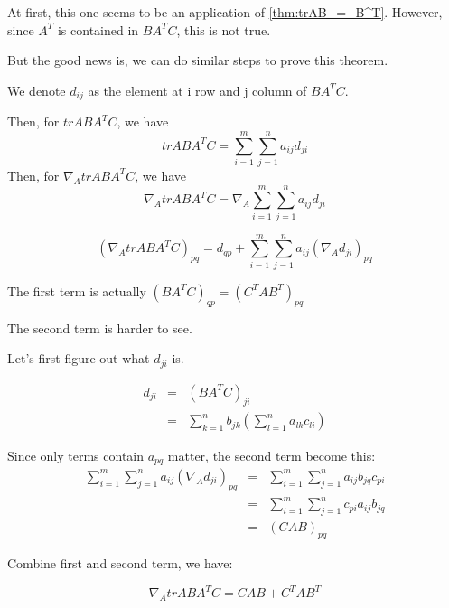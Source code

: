 \documentclass[a4paper]{article}
\newenvironment{proof}[1][Proof]{\begin{trivlist}
\item[\hskip \labelsep {\bfseries #1}]}{\end{trivlist}}
\newcommand{\qed}{\nobreak \ifvmode \relax \else
      \ifdim\lastskip<1.5em \hskip-\lastskip
      \hskip1.5em plus0em minus0.5em \fi \nobreak
      \vrule height0.75em width0.5em depth0.25em\fi}
\begin{document}
\begin{proof}
	At first, this one seems to be an application of
	\cref{thm:trAB_=_B^T}. However, since $A^T$ is contained in $BA^TC$,
	this is not true.

	But the good news is, we can do similar steps to prove this theorem.

	We denote $d_{ij}$ as the element at i row and j column of $BA^TC$.

	Then, for $trABA^TC$, we have
	\begin{displaymath}
		trABA^TC = \sum\limits^{m}_{i=1}\sum\limits^{n}_{j=1}a_{ij}d_{ji}
	\end{displaymath}
	Then, for $\nabla_A trABA^TC$, we have
	\begin{displaymath}
		\nabla_A trABA^TC = \nabla_A \sum\limits^{m}_{i=1}\sum\limits^{n}_{j=1}a_{ij}d_{ji}
	\end{displaymath}

	\begin{displaymath}
		(\nabla_A trABA^TC)_{pq} = d_{qp} +
		\sum\limits^{m}_{i=1}\sum\limits^{n}_{j=1}a_{ij}(\nabla_A
		d_{ji})_{pq}
	\end{displaymath}

	The first term is actually $(BA^TC)_{qp} = (C^TAB^T)_{pq}$

	The second term is harder to see.

	Let's first figure out what $d_{ji}$ is.

	\begin{eqnarray}
		d_{ji}	& = & (BA^TC)_{ji} \nonumber\\
		& = &
		\sum\limits^{n}_{k=1}b_{jk}(\sum\limits^{n}_{l=1}a_{lk}c_{li})
		\nonumber
	\end{eqnarray}

	Since only terms contain $a_{pq}$ matter, the second term become
	this:
	\begin{eqnarray}
		\sum\limits^{m}_{i=1}\sum\limits^{n}_{j=1}a_{ij}(\nabla_A
		d_{ji})_{pq} & = &
				\sum\limits^{m}_{i=1}\sum\limits^{n}_{j=1}a_{ij}b_{jq}c_{pi}
				\nonumber\\
				& = & \sum\limits^{m}_{i=1}\sum\limits^{n}_{j=1}c_{pi}a_{ij}b_{jq}
				\nonumber\\
				& = & (CAB)_{pq} \nonumber
	\end{eqnarray}

	Combine first and second term, we have:

	\begin{displaymath}
		\nabla_A trABA^TC = CAB + C^TAB^T
	\end{displaymath}
	\qed

\end{proof}
\end{document}
